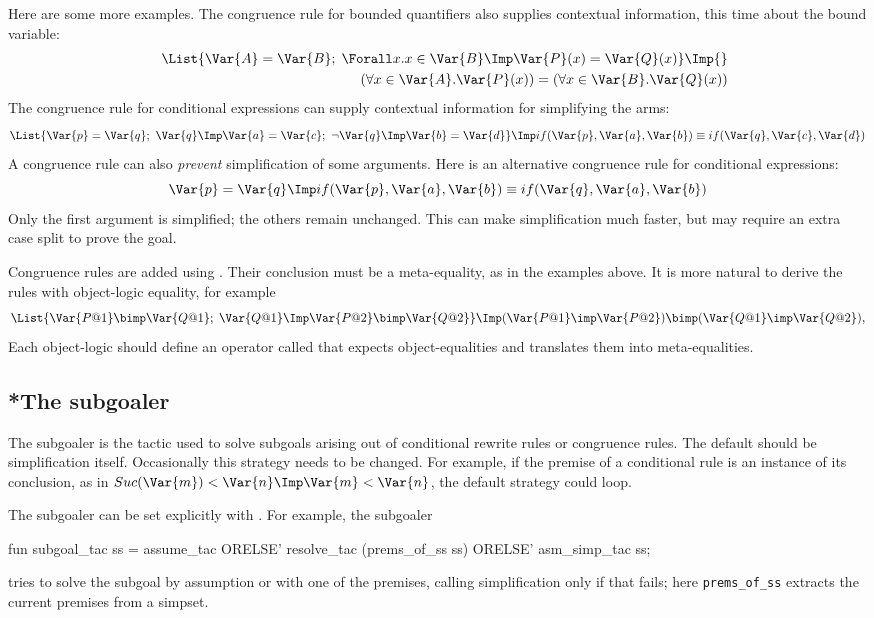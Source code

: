 Here are some more examples.  The congruence rule for bounded quantifiers
also supplies contextual information, this time about the bound variable:
\begin{eqnarray*}
  &&\List{\Var{A}=\Var{B};\; 
          \Forall x. x\in \Var{B} \Imp \Var{P}(x) = \Var{Q}(x)} \Imp{} \\
 &&\qquad\qquad
    (\forall x\in \Var{A}.\Var{P}(x)) = (\forall x\in \Var{B}.\Var{Q}(x))
\end{eqnarray*}
The congruence rule for conditional expressions can supply contextual
information for simplifying the arms:
\[ \List{\Var{p}=\Var{q};~ \Var{q} \Imp \Var{a}=\Var{c};~
         \neg\Var{q} \Imp \Var{b}=\Var{d}} \Imp
   if(\Var{p},\Var{a},\Var{b}) \equiv if(\Var{q},\Var{c},\Var{d})
\]
A congruence rule can also {\em prevent\/} simplification of some arguments.
Here is an alternative congruence rule for conditional expressions:
\[ \Var{p}=\Var{q} \Imp
   if(\Var{p},\Var{a},\Var{b}) \equiv if(\Var{q},\Var{a},\Var{b})
\]
Only the first argument is simplified; the others remain unchanged.
This can make simplification much faster, but may require an extra case split
to prove the goal.  

Congruence rules are added using .  Their conclusion
must be a meta-equality, as in the examples above.  It is more
natural to derive the rules with object-logic equality, for example
\[ \List{\Var{P@1} \bimp \Var{Q@1};\; \Var{Q@1} \Imp \Var{P@2} \bimp \Var{Q@2}}
   \Imp (\Var{P@1} \imp \Var{P@2}) \bimp (\Var{Q@1} \imp \Var{Q@2}),
\]
Each object-logic should define an operator called  that
expects object-equalities and translates them into meta-equalities.

\subsection{*The subgoaler}
The subgoaler is the tactic used to solve subgoals arising out of
conditional rewrite rules or congruence rules.  The default should be
simplification itself.  Occasionally this strategy needs to be changed.  For
example, if the premise of a conditional rule is an instance of its
conclusion, as in $Suc(\Var{m}) < \Var{n} \Imp \Var{m} < \Var{n}$, the
default strategy could loop.

The subgoaler can be set explicitly with .  For
example, the subgoaler
\begin{ttbox}
fun subgoal_tac ss = assume_tac ORELSE'
                     resolve_tac (prems_of_ss ss) ORELSE' 
                     asm_simp_tac ss;
\end{ttbox}
tries to solve the subgoal by assumption or with one of the premises, calling
simplification only if that fails; here {\tt prems_of_ss} extracts the
current premises from a simpset.

